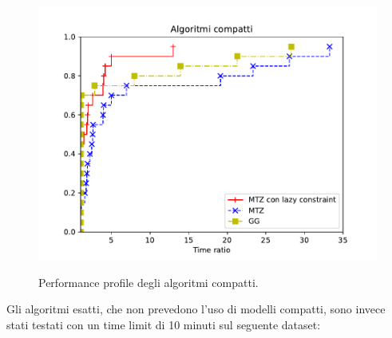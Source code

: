 \begin{figure}[H] 
\begin{center} 
  \includegraphics[scale=0.7]{Images/pp_compact}\\ 
  \caption{\footnotesize{Performance profile degli algoritmi compatti.}}
  \label{pp_compact} 
\end{center} 
\end{figure}
Gli algoritmi esatti, che non prevedono l'uso di modelli compatti, sono invece stati testati con un time limit di 10 minuti sul seguente dataset:
